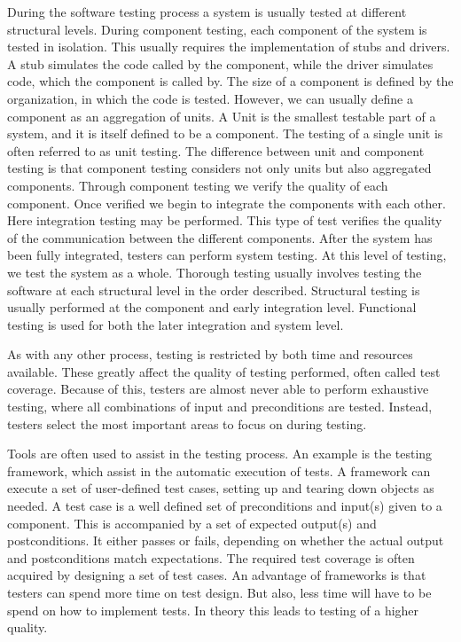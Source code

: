 During the software testing process a system is usually tested at different structural levels. During component testing, each component of the system is tested in isolation. This usually requires the implementation of stubs and drivers. A stub simulates the code called by the component, while the driver simulates code, which the component is called by. The size of a component is defined by the organization, in which the code is tested. However, we can usually define a component as an aggregation of units. A Unit is the smallest testable part of a system, and it is itself defined to be a component. The testing of a single unit is often referred to as unit testing. The difference between unit and component testing is that component testing considers not only units but also aggregated components. Through component testing we verify the quality of each component. Once verified we begin to integrate the components with each other. Here integration testing may be performed. This type of test verifies the quality of the communication between the different components. After the system has been fully integrated, testers can perform system testing. At this level of testing, we test the system as a whole. Thorough testing usually involves testing the software at each structural level in the order  described. Structural testing is usually performed at the component and early integration level. Functional testing is used for both the later integration and system level.

As with any other process, testing is restricted by both time and resources available. These greatly affect the quality of testing performed, often called test coverage. Because of this, testers are almost never able to perform exhaustive testing, where all combinations of input and preconditions are tested. Instead, testers select the most important areas to focus on during testing.

Tools are often used to assist in the testing process. An example is the testing framework, which assist in the automatic execution of tests. A framework can execute a set of user-defined test cases, setting up and tearing down objects as needed. A test case is a well defined set of preconditions and input(s) given to a component. This is accompanied by a set of expected output(s) and postconditions. It either passes or fails, depending on whether the actual output and postconditions match expectations. The required test coverage is often acquired by designing a set of test cases. An advantage of frameworks is that testers can spend more time on test design. But also, less time will have to be spend on how to implement tests. In theory this leads to testing of a higher quality.

